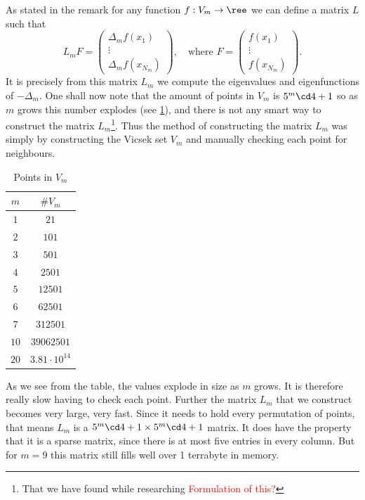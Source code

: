 As stated in the remark for any function $f: V_m \to \ree$ we can define a matrix $L$ such that
\begin{equation}
	L_mF = \begin{pmatrix}
		\Delta_m f(x_1)\\
		\vdots \\
		\Delta_{m}f(x_{N_m})
	\end{pmatrix}, \quad \text{where } F = \begin{pmatrix}
	f(x_1)\\
	\vdots \\
	f(x_{N_m})
	\end{pmatrix}.
\end{equation}
It is precisely from this matrix $L_m$ we compute the eigenvalues and eigenfunctions of $-\Delta_m$. One shall now note that the amount of points in $V_m$ is $5^{m}\cd 4 +1$ so as $m$ grows this number explodes (see \ref{TableOfValues}), and there is not any smart way to construct the matrix $L_m$\footnote{That we have found while researching \textcolor{red}{Formulation of this?}}. Thus the method of constructing the matrix $L_m$ was simply by constructing the Vicsek set $V_m$ and manually checking each point for neighbours.
\begin{table}[!ht]\label{TableOfValues}
	\centering
	\begin{tabular}{|c|c|}
		\hline
		$m$  & $\# V_m$ \\ \hline
		$1$  & $21$\\ \hline
		$2$  & $101$\\ \hline
		$3$  & $501$\\ \hline
		$4$  & $2501$\\ \hline
		$5$  & $12501$\\ \hline
		$6$  & $62501$ \\ \hline
		$7$  & $312501$\\ \hline
		$10$ & $39 062 501$\\ \hline
		$20$ & $3.81\cdot10^{14}$\\ \hline                 
	\end{tabular}
	\caption{Points in $V_m$}
\end{table}

As we see from the table, the values explode in size as $m$ grows. It is therefore really slow having to check each point. Further the matrix $L_m$ that we construct becomes very large, very fast. Since it needs to hold every permutation of points, that means $L_m$ is a $5^{m}\cd 4 + 1 \times 5^{m}\cd 4 + 1$ matrix. It does have the property that it is a sparse matrix, since there is at most five entries in every column. But for $m= 9$ this matrix still fills well over 1 terrabyte in memory.

